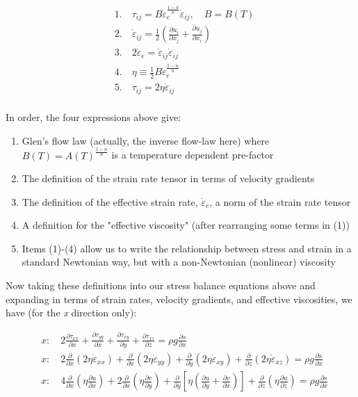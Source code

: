 \begin{align*}
  & 1.\quad \tau _{ij}=B\dot{\varepsilon }_{e}^{\frac{1-n}{n}}\dot{\varepsilon }_{ij},\quad B=B(T) \\ 
 & 2.\quad \dot{\varepsilon }_{ij}=\frac{1}{2}\left( \frac{\partial u_{i}}{\partial x_{j}}+\frac{\partial u_{j}}{\partial x_{i}} \right) \\ 
 & 3.\quad 2\dot{\varepsilon }_{e}=\dot{\varepsilon }_{ij}\dot{\varepsilon }_{ij} \\ 
 & 4.\quad \eta \equiv \frac{1}{2}B\dot{\varepsilon }_{e}^{\frac{1-n}{n}} \\ 
 & 5.\quad \tau _{ij}=2\eta \dot{\varepsilon }_{ij} \\ 
\end{align*}

In order, the four expressions above give: 

\begin{enumerate}
\item  Glen's flow law (actually, the inverse flow-law here) where $B(T) = A(T)^{\frac{1-n}{n}}$ is a temperature dependent pre-factor
\item  The definition of the strain rate tensor in terms of velocity gradients
\item  The definition of the effective strain rate, $\dot{\varepsilon }_{e}$, a norm of the strain rate tensor
\item  A definition for the "effective viscosity" (after rearranging some terms in (1))
\item  Items (1)-(4) allow us to write the relationship between stress and strain in a standard Newtonian way, but with a non-Newtonian (nonlinear) viscosity
\end{enumerate}

Now taking these definitions into our stress balance equations above and expanding in terms of strain rates, velocity gradients, and effective viscosities, we have (for the \textit{x} direction only):

\begin{align*}
  & x:\quad 2\frac{\partial \tau _{xx}}{\partial x}+\frac{\partial \tau _{yy}}{\partial x}+\frac{\partial \tau _{xy}}{\partial y}+\frac{\partial \tau _{xz}}{\partial z}=\rho g\frac{\partial s}{\partial x} \\ 
 & x:\quad 2\frac{\partial }{\partial x}\left( 2\eta \dot{\varepsilon }_{xx} \right)+\frac{\partial }{\partial x}\left( 2\eta \dot{\varepsilon }_{yy} \right)+\frac{\partial }{\partial y}\left( 2\eta \dot{\varepsilon }_{xy} \right)+\frac{\partial }{\partial z}\left( 2\eta \dot{\varepsilon }_{xz} \right)=\rho g\frac{\partial s}{\partial x} \\ 
 & x:\quad 4\frac{\partial }{\partial x}\left( \eta \frac{\partial u}{\partial x} \right)+2\frac{\partial }{\partial x}\left( \eta \frac{\partial v}{\partial y} \right)+\frac{\partial }{\partial y}\left[ \eta \left( \frac{\partial u}{\partial y}+\frac{\partial v}{\partial x} \right) \right]+\frac{\partial }{\partial z}\left( \eta \frac{\partial u}{\partial z} \right)=\rho g\frac{\partial s}{\partial x} \\ 
\end{align*}


